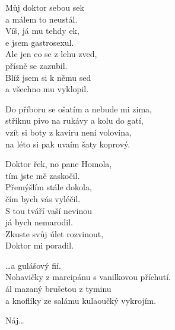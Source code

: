 
\ve{}
Můj doktor sebou sek\\
a málem to neustál.\\
Víš, já mu tehdy ek,\\
e jsem gastrosexul.\\
Ale jen co se z lehu zved,\\
přísně se zazubil.\\
Blíž jsem si k němu sed\\
a všechno mu vyklopil. 

\cho{}
Do příboru se ošatím a nebude mi zima, \\
stříknu pivo na rukávy a kolu do gatí, \quad{} \\
vzít si boty z kaviru není volovina, \\
na léto si pak uvaím šaty koprový. 

\ve{}
Doktor řek, no pane Homola,\\
tím jste mě zaskočil.\\
Přemýšlím stále dokola,\\
čím bych vás vyléčil.\\
S tou tváří vaší nevinou\\
já bych nemarodil.\\
Zkuste svůj úlet rozvinout,\\
Doktor mi poradil.

\cho{}
\ldots a gulášový fií.\\
Nohavičky z marcipánu s vanilkovou příchutí.\\
ál mazaný brušetou z tyminu\\
a knoflíky ze salámu kulaoučký vykrojím. 

\cho{}
Náj\ldots 

\esong{}